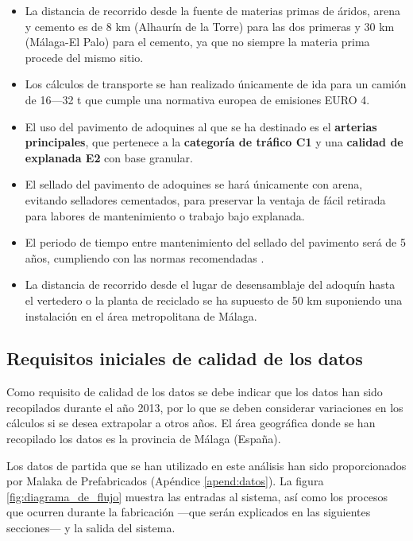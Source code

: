 \begin{itemize}
  \item La distancia de recorrido desde la fuente de materias primas de áridos, arena y cemento es de 8 \si{km} (Alhaurín de la Torre) para las dos primeras y 30 \si{km} (Málaga-El Palo) para el cemento, ya que no siempre la materia prima procede del mismo sitio.
  \item Los cálculos de transporte se han realizado únicamente de ida para un camión de 16—32 \si{\tonne} que cumple una normativa europea de emisiones EURO 4.
  \item El uso del pavimento de adoquines al que se ha destinado es el \textbf{arterias principales}, que pertenece a la \textbf{categoría de tráfico C1} y una \textbf{calidad de explanada E2} con base granular.
  \item El sellado del pavimento de adoquines se hará únicamente con arena, evitando selladores cementados, para preservar la ventaja de fácil retirada para labores de mantenimiento o trabajo bajo explanada.
  \item El periodo de tiempo entre mantenimiento del sellado del pavimento será de 5 años, cumpliendo con las normas recomendadas \cite{euroadoquinc}.
  \item La distancia de recorrido desde el lugar de desensamblaje del adoquín hasta el vertedero o la planta de reciclado se ha supuesto de 50 \si{km} suponiendo una instalación en el área metropolitana de Málaga.

\end{itemize}

\subsection{Requisitos iniciales de calidad de los datos}
Como requisito de calidad de los datos se debe indicar que los datos han sido recopilados durante el año 2013, por lo que se deben considerar variaciones en los cálculos si se desea extrapolar a otros años. El área geográfica donde se han recopilado los datos es la provincia de Málaga (España).

Los datos de partida que se han utilizado en este análisis han sido proporcionados por Malaka de Prefabricados (Apéndice \ref{apend:datos}). La figura \ref{fig:diagrama_de_flujo} muestra las entradas al sistema, así como los procesos que ocurren durante la fabricación —que serán explicados en las siguientes secciones— y la salida del sistema.

